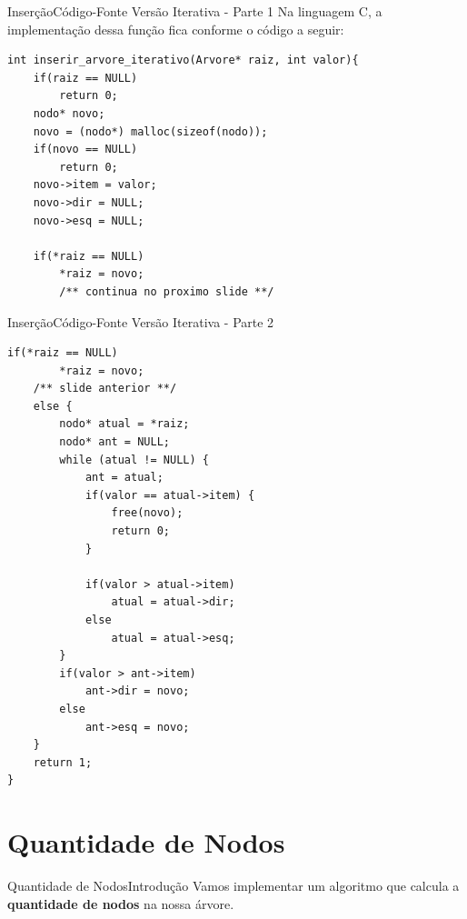\documentclass[aspectratio=169]{beamer}
\begin{document}

\begin{frame}[fragile]{Inserção}{Código-Fonte Versão Iterativa - Parte 1}
Na linguagem C, a implementação dessa função fica conforme o código a seguir:
\begin{lstlisting}[style=CStyle,basicstyle=\tiny]
int inserir_arvore_iterativo(Arvore* raiz, int valor){
    if(raiz == NULL)
        return 0;
    nodo* novo;
    novo = (nodo*) malloc(sizeof(nodo));
    if(novo == NULL)
        return 0;
    novo->item = valor;
    novo->dir = NULL;
    novo->esq = NULL;

    if(*raiz == NULL)
        *raiz = novo;
        /** continua no proximo slide **/  
\end{lstlisting}  
\end{frame}


\begin{frame}[fragile]{Inserção}{Código-Fonte Versão Iterativa - Parte 2}
\begin{lstlisting}[style=CStyle,basicstyle=\tiny,firstnumber=12]
    if(*raiz == NULL)
        *raiz = novo;        
    /** slide anterior **/
    else {
        nodo* atual = *raiz;
        nodo* ant = NULL;
        while (atual != NULL) {
            ant = atual;
            if(valor == atual->item) {
                free(novo);
                return 0;
            }

            if(valor > atual->item)
                atual = atual->dir;
            else
                atual = atual->esq;
        }
        if(valor > ant->item)
            ant->dir = novo;
        else
            ant->esq = novo;
    }
    return 1;
}  
\end{lstlisting}  
\end{frame}

\section{Quantidade de Nodos}

\begin{frame}[fragile]{Quantidade de Nodos}{Introdução}
Vamos implementar um algoritmo que calcula a {\bf quantidade de nodos} na nossa árvore.
\end{frame}
\end{document}
